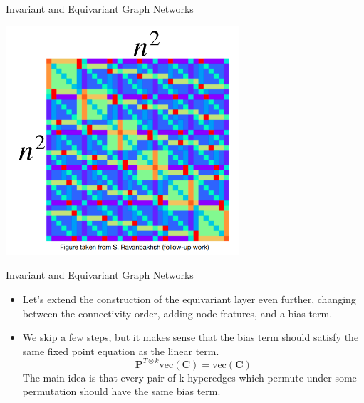 \documentclass{beamer}
\begin{document}
\begin{frame}{Invariant and Equivariant Graph Networks}
    \begin{center}
        \includegraphics[width=0.65\textwidth]{../figures/2-tensor-eq.png}
    \end{center}
\end{frame}
\begin{frame}{Invariant and Equivariant Graph Networks}
    \begin{itemize}
        \setlength{\itemsep}{\fill}
        \item Let's extend the construction of the equivariant layer even further, changing between the connectivity order, adding node features, and a bias term.
        \item We skip a few steps, but it makes sense that the bias term should satisfy the same fixed point equation as the linear term.
        \[ \mathbf{P}^{T \otimes k} \text{vec}(\mathbf{C}) = \text{vec}(\mathbf{C}) \]
        The main idea is that every pair of k-hyperedges which permute under some permutation should have the same bias term.
    \end{itemize}
\end{frame}
\end{document}
